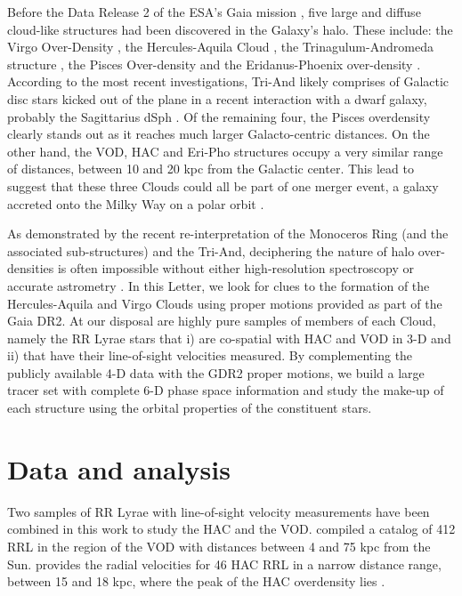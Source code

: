 \documentclass[fleqn,usenatbib]{mnras}
\begin{document}
Before the Data Release 2 \citep[][]{Brown2018} of the ESA's Gaia
mission \citep[][]{Prusti2016}, five large and diffuse cloud-like
structures had been discovered in the Galaxy's halo. These include:
the Virgo Over-Density
\citep[VOD,][]{Vivas2001,Newberg2002,Duffau2006,Juric2008,Bonaca2012},
the Hercules-Aquila Cloud \citep[HAC,][]{Be07,Simion2014}, the
Trinagulum-Andromeda structure
\citep[Tri-And,][]{Rocha2004,Majewski2004,Deason2014}, the Pisces
Over-density \citep[][]{Sesar2007,Wa09,Nie2015} and the
Eridanus-Phoenix over-density \citep[Eri-Pho,][]{Li2016}. According to
the most recent investigations, Tri-And likely comprises of Galactic
disc stars kicked out of the plane in a recent interaction with a
dwarf galaxy, probably the Sagittarius dSph
\citep[e.g.][]{Pr15,Bergemann2018,Hayes2018}. Of the remaining four,
the Pisces overdensity clearly stands out as it reaches much larger
Galacto-centric distances. On the other hand, the VOD, HAC and Eri-Pho
structures occupy a very similar range of distances, between 10 and 20
kpc from the Galactic center. This lead \citet{Li2016} to suggest that
these three Clouds could all be part of one merger event, a galaxy
accreted onto the Milky Way on a polar orbit \citep[see
  also][]{Juric2008}.

As demonstrated by the recent re-interpretation of the Monoceros Ring
(and the associated sub-structures) and the Tri-And, deciphering the
nature of halo over-densities is often impossible without either
high-resolution spectroscopy \citep[e.g.][]{Bergemann2018} or accurate
astrometry \citep[e.g.][]{deBoer2018,Deason2018}. In this Letter, we
look for clues to the formation of the Hercules-Aquila and Virgo
Clouds using proper motions provided as part of the Gaia DR2. At our
disposal are highly pure samples of members of each Cloud, namely the
RR Lyrae stars that i) are co-spatial with HAC and VOD in 3-D and ii)
that have their line-of-sight velocities measured. By complementing
the publicly available 4-D data with the GDR2 proper motions, we build
a large tracer set with complete 6-D phase space information and study
the make-up of each structure using the orbital properties of the
constituent stars.

\section{Data and analysis}
Two samples of RR Lyrae with line-of-sight velocity measurements have been combined in this work to study the HAC and the VOD. \cite{Vivas2016} compiled a catalog of 412 RRL in the region of the VOD with distances between 4 and 75 kpc from the Sun. \cite{Simion2018} provides the radial velocities for 46 HAC RRL in a narrow distance range, between 15 and 18 kpc, where the peak of the HAC overdensity lies \citet{Simion2014}. 
%
\end{document}
